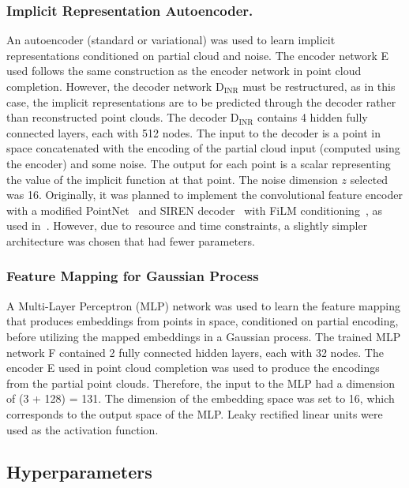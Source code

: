         \subsubsection{Implicit Representation Autoencoder.}
        An autoencoder (standard or variational) was used to learn implicit representations conditioned on partial cloud and noise. The encoder network E used follows the same construction as the encoder network in point cloud completion. However, the decoder network D$_\text{INR}$ must be restructured, as in this case, the implicit representations are to be predicted through the decoder rather than reconstructed point clouds. The decoder D$_\text{INR}$ contains 4 hidden fully connected layers, each with 512 nodes. The input to the decoder is a point in space concatenated with the encoding of the partial cloud input (computed using the encoder) and some noise. The output for each point is a scalar representing the value of the implicit function at that point. The noise dimension $z$ selected was 16. Originally, it was planned to implement the convolutional feature encoder with a modified PointNet~\cite{PointNet} and SIREN decoder~\cite{SIREN} with FiLM conditioning~\cite{FiLM}, as used in~\cite{NeuralHessian}. However, due to resource and time constraints, a slightly simpler architecture was chosen that had fewer parameters.

        \subsubsection{Feature Mapping for Gaussian Process}
        A Multi-Layer Perceptron (MLP) network was used to learn the feature mapping that produces embeddings from points in space, conditioned on partial encoding, before utilizing the mapped embeddings in a Gaussian process. The trained MLP network F contained 2 fully connected hidden layers, each with 32 nodes. The encoder E used in point cloud completion was used to produce the encodings from the partial point clouds. Therefore, the input to the MLP had a dimension of (3 + 128) = 131. The dimension of the embedding space was set to 16, which corresponds to the output space of the MLP. Leaky rectified linear units were used as the activation function.


    \subsection{Hyperparameters}

